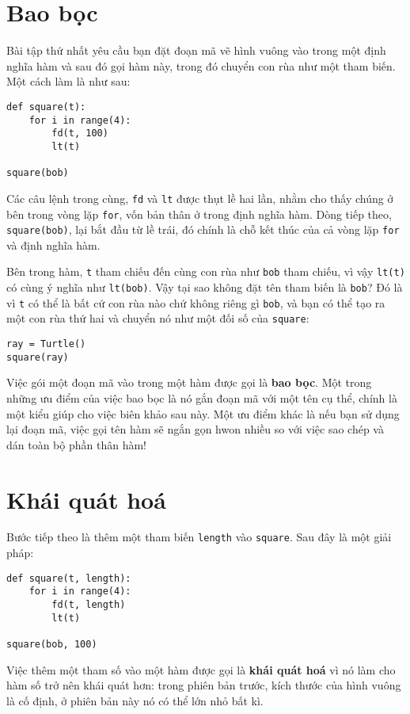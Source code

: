 \documentclass[11pt]{book}
\begin{document}
\section{Bao bọc}
Bài tập thứ nhất yêu cầu bạn đặt đoạn mã vẽ hình vuông vào trong
một định nghĩa hàm và sau đó gọi hàm này, trong đó chuyển con rùa
như một tham biến. Một cách làm là như sau:

\beforeverb
\begin{verbatim}
def square(t):
    for i in range(4):
        fd(t, 100)
        lt(t)

square(bob)
\end{verbatim}
\afterverb
%
Các câu lệnh trong cùng, {\tt fd} và {\tt lt} được thụt lề hai lần,
nhằm cho thấy chúng ở bên trong vòng lặp {\tt for}, vốn bản 
thân ở trong định nghĩa hàm. Dòng tiếp theo,
{\tt square(bob)}, lại bắt đầu từ lề trái, đó chính là chỗ kết thúc
của cả vòng lặp {\tt for} và định nghĩa hàm.

Bên trong hàm, {\tt t} tham chiếu đến cùng con rùa như {\tt bob}
tham chiếu, vì vậy {\tt lt(t)} có cùng ý nghĩa như {\tt lt(bob)}.
Vậy tại sao không đặt tên tham biến là {\tt bob}?  Đó là vì {\tt t}
có thể là bất cứ con rùa nào chứ không riêng gì {\tt bob}, và bạn 
có thể tạo ra một con rùa thứ hai và chuyển nó như một đối số 
của {\tt square}:

\beforeverb
\begin{verbatim}
ray = Turtle()
square(ray)
\end{verbatim}
\afterverb
%
Việc gói một đoạn mã vào trong một hàm được gọi là 
{\bf bao bọc}. Một trong những ưu điểm của việc bao bọc
là nó gắn đoạn mã với một tên cụ thể, chính là một kiểu giúp cho
việc biên khảo sau này. Một ưu điểm khác là nếu bạn sử dụng lại
đoạn mã, việc gọi tên hàm sẽ ngắn gọn hwon nhiều so với việc
sao chép và dán toàn bộ phần thân hàm!



\section{Khái quát hoá}

Bước tiếp theo là thêm một tham biến {\tt length} vào {\tt square}.
Sau đây là một giải pháp:

\beforeverb
\begin{verbatim}
def square(t, length):
    for i in range(4):
        fd(t, length)
        lt(t)

square(bob, 100)
\end{verbatim}
\afterverb
%
Việc thêm một tham số vào một hàm được gọi là 
{\bf khái quát hoá} vì nó làm cho hàm số trở nên khái quát
hơn: trong phiên bản trước, kích thước của hình vuông là cố định,
ở phiên bản này nó có thể lớn nhỏ bất kì.
\end{document}
